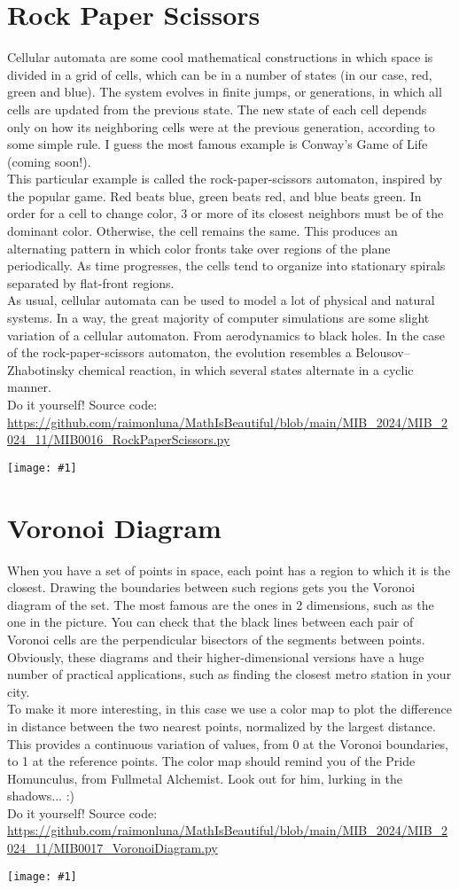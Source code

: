 \documentclass[12pt,landscape]{article}
\newcommand{\artpage}[3][]{%
  \begin{minipage}[t]{0.48\linewidth}
    \vspace{0pt} %
    \section*{#2} %
    \addcontentsline{toc}{section}{#2} %
    #3 %
  \end{minipage}%
  \hfill
  \begin{minipage}[t]{0.48\linewidth}
    \vspace{0pt} %
    \centering
    \texttt{[image: \#1]}
  \end{minipage}%
  \newpage
}
\begin{document}
\artpage[../Output/LowQuality/MIB0016_RockPaperScissors.png]{Rock Paper Scissors}{%
Cellular automata are some cool mathematical constructions in which space is divided in a grid of cells, which can be in a number of states (in our case, red, green and blue). The system evolves in finite jumps, or generations, in which all cells are updated from the previous state. The new state of each cell depends only on how its neighboring cells were at the previous generation, according to some simple rule. I guess the most famous example is Conway's Game of Life (coming soon!).\\

This particular example is called the rock-paper-scissors automaton, inspired by the popular game. Red beats blue, green beats red, and blue beats green. In order for a cell to change color, 3 or more of its closest neighbors must be of the dominant color. Otherwise, the cell remains the same. This produces an alternating pattern in which color fronts take over regions of the plane periodically. As time progresses, the cells tend to organize into stationary spirals separated by flat-front regions.\\

As usual, cellular automata can be used to model a lot of physical and natural systems. In a way, the great majority of computer simulations are some slight variation of a cellular automaton. From aerodynamics to black holes. In the case of the rock-paper-scissors automaton, the evolution resembles a Belousov–Zhabotinsky chemical reaction, in which several states alternate in a cyclic manner.\\

Do it yourself! Source code: \url{https://github.com/raimonluna/MathIsBeautiful/blob/main/MIB_2024/MIB_2024_11/MIB0016_RockPaperScissors.py}
}

\artpage[../Output/LowQuality/MIB0017_VoronoiDiagram.png]{Voronoi Diagram}{%
When you have a set of points in space, each point has a region to which it is the closest. Drawing the boundaries between such regions gets you the Voronoi diagram of the set. The most famous are the ones in 2 dimensions, such as the one in the picture. You can check that the black lines between each pair of Voronoi cells are the perpendicular bisectors of the segments between points. Obviously, these diagrams and their higher-dimensional versions have a huge number of practical applications, such as finding the closest metro station in your city.\\

To make it more interesting, in this case we use a color map to plot the difference in distance between the two nearest points, normalized by the largest distance. This provides a continuous variation of values, from 0 at the Voronoi boundaries, to 1 at the reference points. The color map should remind you of the Pride Homunculus, from Fullmetal Alchemist. Look out for him, lurking in the shadows... :)\\

Do it yourself! Source code: \url{https://github.com/raimonluna/MathIsBeautiful/blob/main/MIB_2024/MIB_2024_11/MIB0017_VoronoiDiagram.py}
}
\end{document}
